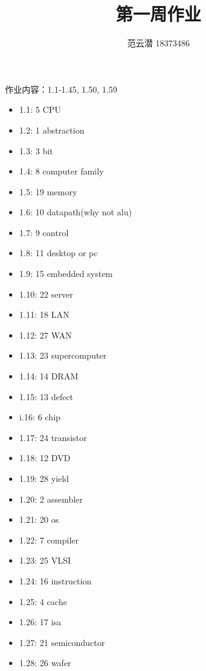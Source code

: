 \documentclass[lang=cn,11pt,a4paper,cite=authoryear]{elegantpaper}
\title{第一周作业}
\author{范云潜 18373486}
\institute{微电子学院 184111 班}
\date{\zhtoday}
\begin{document}
\maketitle

作业内容：1.1-1.45, 1.50, 1.59




\begin{itemize}
    \item 1.1: 5 CPU
    \item 1.2: 1 abstraction
    \item 1.3: 3 bit 
    \item 1.4: 8 computer family
    \item 1.5: 19 memory
    \item 1.6: 10 datapath(why not alu)
    \item 1.7: 9 control
    \item 1.8: 11 desktop or pc
    \item 1.9: 15 embedded system
    \item 1.10: 22 server 
    \item 1.11: 18 LAN 
    \item 1.12: 27 WAN 
    \item 1.13: 23 supercomputer
    \item 1.14: 14 DRAM
    \item 1.15: 13 defect
    \item i.16: 6 chip
    \item 1.17: 24 transistor
    \item 1.18: 12 DVD
    \item 1.19: 28 yield
    \item 1.20: 2 assembler
    \item 1.21: 20 os
    \item 1.22: 7 compiler
    \item 1.23: 25 VLSI
    \item 1.24: 16 instruction
    \item 1.25: 4 cache
    \item 1.26: 17 isa 
    \item 1.27: 21 semiconductor
    \item 1.28: 26 wafer 
\end{itemize}

\end{document}
